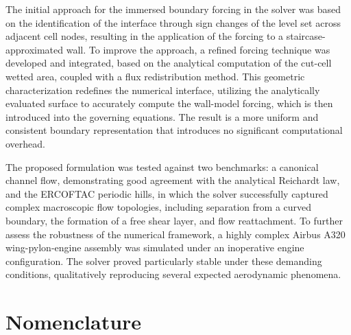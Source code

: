 \documentclass[12pt, a4paper, twoside, openright]{book}
\begin{document}
The initial approach for the immersed boundary forcing in the solver was based on the identification of the interface through sign changes of the level set across adjacent cell nodes, resulting in the application of the forcing to a staircase-approximated wall. To improve the approach, a refined forcing technique was developed and integrated, based on the analytical computation of the cut-cell wetted area, coupled with a flux redistribution method. This geometric characterization redefines the numerical interface, utilizing the analytically evaluated surface to accurately compute the wall-model forcing, which is then introduced into the governing equations. The result is a more uniform and consistent boundary representation that introduces no significant computational overhead.

The proposed formulation was tested against two benchmarks: a canonical channel flow, demonstrating good agreement with the analytical Reichardt law, and the ERCOFTAC periodic hills, in which the solver successfully captured complex macroscopic flow topologies, including separation from a curved boundary, the formation of a free shear layer, and flow reattachment. To further assess the robustness of the numerical framework, a highly complex Airbus A320 wing-pylon-engine assembly was simulated under an inoperative engine configuration. The solver proved particularly stable under these demanding conditions, qualitatively reproducing several expected aerodynamic phenomena.

\newpage
\begingroup
\let\cleardoublepage\clearpage
\chapter*{Nomenclature}
\endgroup
{}
\end{document}
